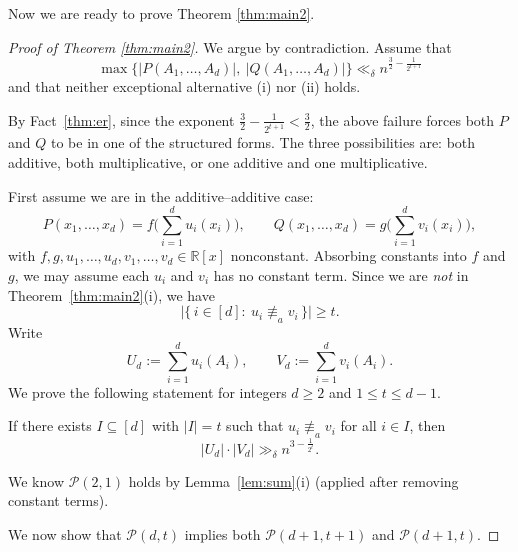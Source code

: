 \documentclass[12pt,reqno]{amsart}
\numberwithin{equation}{section}
\begin{document}
Now we are ready to prove Theorem \ref{thm:main2}.















\begin{proof}[Proof of Theorem \ref{thm:main2}]
We argue by contradiction. Assume that
\[
\max\{|P(A_{1},\ldots,A_{d})|,\ |Q(A_{1},\ldots,A_{d})|\}\ll_{\delta} n^{\frac32-\frac{1}{2^{t+1}}}
\]
and that neither exceptional alternative (i) nor (ii) holds.

By Fact~\ref{thm:er}, since the exponent $\frac32-\frac1{2^{t+1}}<\frac32$, the above failure forces both $P$ and $Q$ to be in one of the structured forms. The three possibilities are: both additive, both multiplicative, or one additive and one multiplicative.

First assume we are in the additive--additive case:
\[
P(x_{1},\ldots,x_{d})=f\!\Big(\sum_{i=1}^{d}u_{i}(x_{i})\Big),
\qquad
Q(x_{1},\ldots,x_{d})=g\!\Big(\sum_{i=1}^{d}v_{i}(x_{i})\Big),
\]
with $f,g,u_{1},\ldots,u_{d},v_{1},\ldots,v_{d}\in\mathbb R[x]$ nonconstant. Absorbing constants into $f$ and $g$, we may assume each $u_i$ and $v_i$ has no constant term. Since we are \emph{not} in Theorem~\ref{thm:main2}(i), we have
\[
\bigl|\{\,i\in[d]:\ u_i\not\equiv_a v_i\,\}\bigr|\ge t.
\]
Write
\[
U_d:=\sum_{i=1}^{d}u_i(A_i),\qquad V_d:=\sum_{i=1}^{d}v_i(A_i).
\]
We prove the following statement for integers $d\ge 2$ and $1\le t\le d-1$.

\smallskip
{}
If there exists $I\subseteq[d]$ with $|I|=t$ such that $u_i\not\equiv_a v_i$ for all $i\in I$, then
\[
|U_d|\cdot |V_d|\gg_{\delta} n^{3-\frac1{2^{t}}}.
\]

\smallskip
\noindent We know $\mathcal P(2,1)$ holds by Lemma~\ref{lem:sum}(i) (applied after removing constant terms).

\smallskip
\noindent We now show that $\mathcal P(d,t)$ implies both $\mathcal P(d+1,t+1)$ and $\mathcal P(d+1,t)$.


\end{proof}
\end{document}
